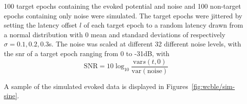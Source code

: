 100 target epochs containing the evoked potential and noise and 100
non-target epochs containing only noise were simulated.
The target epochs were jittered by setting the latency offset $l$
of each target epoch to a random latency drawn from a normal distribution with 0 mean and standard
deviations of respectively $\sigma=0.1,0.2,0.3$s.
The noise was scaled at different 32  different noise levels, with the \ac{snr} of a
target epoch ranging from 0 to -31dB, with
\begin{equation}
  \text{SNR} = 10\log_{10}\frac{\text{var}s(t,0)}{\text{var}\left(\text{noise}\right)}
\end{equation}

A sample of the simulated evoked data is displayed in Figures~\ref{fig:wcble/sim-sine}.

